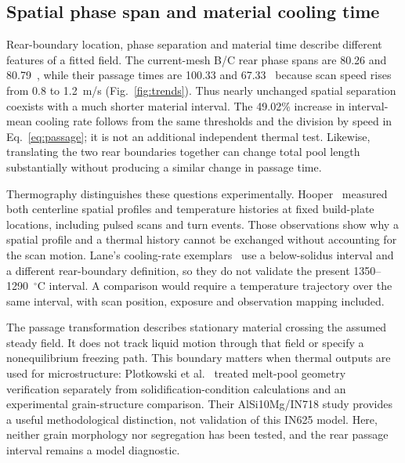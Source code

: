 \subsection{Spatial phase span and material cooling time}
Rear-boundary location, phase separation and material time describe different features of a fitted field. The current-mesh B/C rear phase spans are 80.26 and 80.79~\um{}, while their passage times are 100.33 and 67.33~\us{} because scan speed rises from 0.8 to 1.2~m/s (Fig.~\ref{fig:trends}). Thus nearly unchanged spatial separation coexists with a much shorter material interval. The 49.02\% increase in interval-mean cooling rate follows from the same thresholds and the division by speed in Eq.~\eqref{eq:passage}; it is not an additional independent thermal test. Likewise, translating the two rear boundaries together can change total pool length substantially without producing a similar change in passage time.

Thermography distinguishes these questions experimentally. Hooper~\cite{hooper2018} measured both centerline spatial profiles and temperature histories at fixed build-plate locations, including pulsed scans and turn events. Those observations show why a spatial profile and a thermal history cannot be exchanged without accounting for the scan motion. Lane's cooling-rate exemplars~\cite{lane2020} use a below-solidus interval and a different rear-boundary definition, so they do not validate the present 1350--1290~$^\circ$C interval. A comparison would require a temperature trajectory over the same interval, with scan position, exposure and observation mapping included.

The passage transformation describes stationary material crossing the assumed steady field. It does not track liquid motion through that field or specify a nonequilibrium freezing path. This boundary matters when thermal outputs are used for microstructure: Plotkowski et al.~\cite{Plotkowski2017Rapid} treated melt-pool geometry verification separately from solidification-condition calculations and an experimental grain-structure comparison. Their AlSi10Mg/IN718 study provides a useful methodological distinction, not validation of this IN625 model. Here, neither grain morphology nor segregation has been tested, and the rear passage interval remains a model diagnostic.

